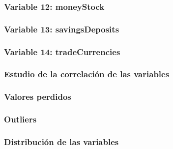\documentclass[12pt,a4paper]{article}
\begin{document}
\subsubsection*{Variable 12: moneyStock}



\subsubsection*{Variable 13: savingsDeposits}



\subsubsection*{Variable 14: tradeCurrencies}



\subsubsection{Estudio de la correlación de las variables}



\subsubsection{Valores perdidos}



\subsubsection{Outliers}



\subsubsection{Distribución de las variables}
\end{document}

